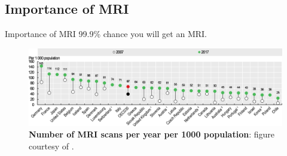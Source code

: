 \subsection{Importance of MRI}
\begin{frame}{Importance of MRI}
    99.9\% chance you will get an MRI.
    \begin{figure}
        \centering
        \includegraphics[width=\textwidth]{Figures/intro_figures/num_mri_scans.png}
        \caption{\label{fig:num-mri-scans} \textbf{Number of MRI scans per year per 1000 population}: figure courtesy of \citet{OECDMRI}.}
    \end{figure}
\end{frame}


